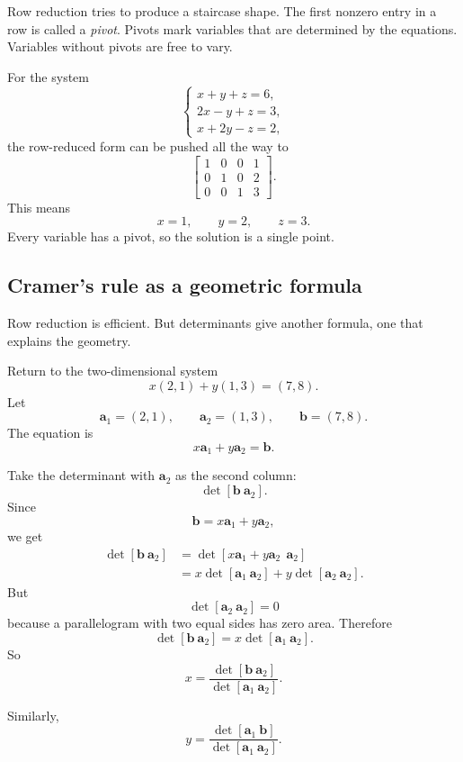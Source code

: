 Row reduction tries to produce a staircase shape.  The first nonzero entry in a row is
called a \emph{pivot}.  Pivots mark variables that are determined by the equations.
Variables without pivots are free to vary.

For the system
\[
\begin{cases}
x+y+z=6,\\
2x-y+z=3,\\
x+2y-z=2,
\end{cases}
\]
the row-reduced form can be pushed all the way to
\[
\left[
\begin{array}{ccc|c}
1&0&0&1\\
0&1&0&2\\
0&0&1&3
\end{array}
\right].
\]
This means
\[
    x=1,\qquad y=2,\qquad z=3.
\]
Every variable has a pivot, so the solution is a single point.

\subsection{Cramer's rule as a geometric formula}

Row reduction is efficient.  But determinants give another formula, one that explains
the geometry.

Return to the two-dimensional system
\[
    x(2,1)+y(1,3)=(7,8).
\]
Let
\[
    \mathbf a_1=(2,1),
    \qquad
    \mathbf a_2=(1,3),
    \qquad
    \mathbf b=(7,8).
\]
The equation is
\[
    x\mathbf a_1+y\mathbf a_2=\mathbf b.
\]

Take the determinant with \(\mathbf a_2\) as the second column:
\[
    \det[\mathbf b\ \mathbf a_2].
\]
Since
\[
    \mathbf b=x\mathbf a_1+y\mathbf a_2,
\]
we get
\[
\begin{aligned}
    \det[\mathbf b\ \mathbf a_2]
    &=
    \det[x\mathbf a_1+y\mathbf a_2\ \ \mathbf a_2]\\
    &=
    x\det[\mathbf a_1\ \mathbf a_2]
    +
    y\det[\mathbf a_2\ \mathbf a_2].
\end{aligned}
\]
But
\[
    \det[\mathbf a_2\ \mathbf a_2]=0
\]
because a parallelogram with two equal sides has zero area.  Therefore
\[
    \det[\mathbf b\ \mathbf a_2]
    =
    x\det[\mathbf a_1\ \mathbf a_2].
\]
So
\[
\boxed{
    x=
    \frac{\det[\mathbf b\ \mathbf a_2]}
         {\det[\mathbf a_1\ \mathbf a_2]}.
}
\]

Similarly,
\[
\boxed{
    y=
    \frac{\det[\mathbf a_1\ \mathbf b]}
         {\det[\mathbf a_1\ \mathbf a_2]}.
}
\]

